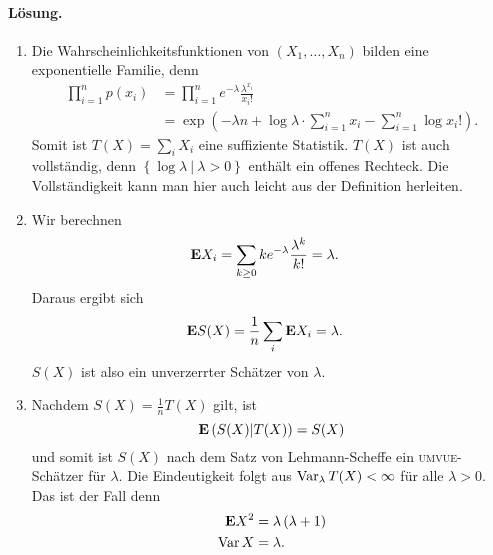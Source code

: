 \paragraph*{Lösung.}
\begin{enumerate}
    \item Die Wahrscheinlichkeitsfunktionen von $\left( X_1, \ldots, X_n \right)$ 
        bilden eine exponentielle Familie, denn
        \begin{align*}
            \prod_{i=1}^{n} p(x_i) &= \prod_{i=1}^n e^{-\lambda } \frac{ \lambda^{ x_i }}{ x_i!} \\
            &= \exp \left( -\lambda n + \log \lambda \cdot \sum_{i=1}^{ n} x_i 
            - \sum_{i=1}^{n} \log x_i! \right).
        \end{align*}
        Somit ist $T(X)= \sum_{i}^{} X_i$ eine suffiziente Statistik. $T(X)$
        ist auch vollständig, denn $\left\{ \log \lambda \ | \ \lambda>0
        \right\}$ enthält ein offenes Rechteck. Die Vollständigkeit kann man
        hier auch leicht aus der Definition herleiten. 
    \item Wir berechnen
        \begin{align*}
            \mathbf{E} X_i &= \sum_{k\geq 0}^{} k e^{-\lambda} \frac{\lambda^k}{ k!} = \lambda.
        \end{align*}
        Daraus ergibt sich
        \begin{align*}
            \mathbf{E} S(X) &= \frac{1}{n} \sum_{i}^{} \mathbf{E} X_i = \lambda.
        \end{align*}
        $S(X)$ ist also ein unverzerrter Schätzer von $\lambda$. 
    \item Nachdem $S(X) = \frac{1}{n} T(X)$ gilt, ist 
        \begin{equation*}
            \mathbf{E} \left( S(X) | T(X) \right) = S(X)
        \end{equation*}
        und somit ist $S(X)$ nach dem Satz von Lehmann-Scheffe ein
        \textsc{umvue}-Schätzer für $\lambda$. Die Eindeutigkeit folgt aus
        $\operatorname{Var}_\lambda T(X) < \infty$ für alle $\lambda >0$. Das ist der Fall
        denn
        \begin{align*}
            \mathbf{E} X^2 &= \lambda\left( \lambda +1 \right) \\
            \operatorname{Var} X &= \lambda.
        \end{align*}
\end{enumerate}









